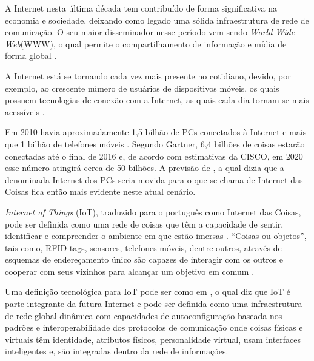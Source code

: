 A Internet nesta última década tem contribuído de forma significativa na economia e sociedade, deixando como legado uma sólida infraestrutura de rede de comunicação. O seu maior disseminador nesse período vem sendo \textit{World Wide Web}(WWW), o qual permite o compartilhamento de informação e mídia de forma global \cite{Chandrakanth:2014}.

A Internet está se tornando cada vez mais presente no cotidiano, devido, por exemplo, ao crescente número de usuários de dispositivos móveis, os quais possuem tecnologias de conexão com a Internet, as quais cada dia tornam-se mais acessíveis \cite{Chandrakanth:2014}.

Em 2010 havia aproximadamente 1,5 bilhão de PCs conectados à Internet e mais que 1 bilhão de telefones móveis \cite{Sundmaeker:2010}. Segundo Gartner\footnotemark {}, 6,4 bilhões de coisas estarão conectadas até o final de 2016 e, de acordo com estimativas da CISCO\footnotemark {}, em 2020 esse número atingirá cerca de 50 bilhões. A previsão de \cite{Sundmaeker:2010}, a qual dizia que a denominada Internet dos PCs seria movida para o que se chama de Internet das Coisas fica então mais evidente neste atual cenário.

\textit{Internet of Things} (IoT), traduzido para o português como Internet das Coisas, pode ser definida como uma rede de coisas que têm a capacidade de sentir, identificar e compreender o ambiente em que estão imersas \cite{Ashton:2009}. ``Coisas ou objetos'', tais como, RFID tags, sensores, telefones móveis, dentre outros, através de esquemas de endereçamento único são capazes de interagir com os outros e cooperar com seus vizinhos para alcançar um objetivo em comum \cite{Atzori:2010}.

Uma definição tecnológica para IoT pode ser como em \cite{Sundmaeker:2010}, o qual diz que IoT é parte integrante da futura Internet e pode ser definida como uma infraestrutura de rede global dinâmica com capacidades de autoconfiguração baseada nos padrões e interoperabilidade dos protocolos de comunicação onde coisas físicas e virtuais têm identidade, atributos físicos, personalidade virtual, usam interfaces inteligentes e, são integradas dentro da rede de informações.

